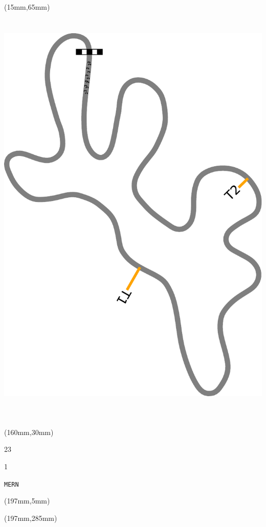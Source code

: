 \begin{textblock*}{185mm}(15mm,65mm)%
\centering
\mbox{\includegraphics[width=185mm,height=210mm,keepaspectratio]{PT/MERN.pdf}}
\end{textblock*}
\begin{textblock*}{40mm}(160mm,30mm)%
\Large
\par{} 
\par23 
\par1 
\par\hfill\tiny\tt MERN\\
\end{textblock*}
\begin{textblock*}{20mm}(197mm,5mm)%
\fbox{\thepage}
\label{MERN}
\end{textblock*}
\begin{textblock*}{20mm}(197mm,285mm)%
\fbox{\thepage}
\end{textblock*}

